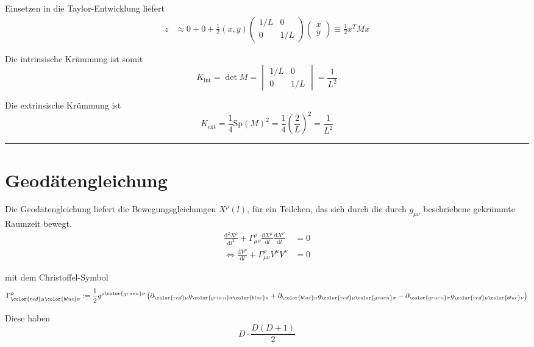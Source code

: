 \documentclass{article}
\newcommand{\diff}{\mathrm{d}}
\newcommand{\lr}[1]{\left(#1\right)}
\begin{document}
{	Einsetzen in die Taylor-Entwicklung liefert
		\begin{align*}
			z &\approx 0 + 0 + \frac{1}{2} (x,y)
			\begin{pmatrix}
				1/L & 0\\
				0 & 1/L
			\end{pmatrix}
			\begin{pmatrix}
				x\\y
			\end{pmatrix}
			\equiv \frac{1}{2} x^T M x
		\end{align*}

	Die intrinsische Krümmung ist somit
		$$K_{\text{int}} = \det M =
		\begin{vmatrix}
			1/L & 0\\
			0 & 1/L
		\end{vmatrix} = \frac{1}{L^2}$$
	
	Die extrinsische Krümmung ist
		$$K_{\text{ext}} = \frac{1}{4}\text{Sp} (M)^2 = \frac{1}{4} \lr{\frac{2}{L}}^2 = \frac{1}{L^2 }$$


\hrule
}


\newpage


\section{Geodätengleichung}
Die Geodätengleichung liefert die Bewegungsgleichungen $X^\rho(l)$, für ein Teilchen, das sich durch die durch $g_{\mu\nu}$ beschriebene gekrümmte Raumzeit bewegt.
	\begin{align}
		\frac{\diff^2X^\rho}{\diff l^2} + \Gamma^\rho_{\mu\nu} \frac{\diff X^\mu}{\diff l}\frac{\diff X^\nu}{\diff l} &= 0 \\
		\Leftrightarrow \frac{\diff V^\rho}{\diff l} + \Gamma^\rho_{\mu\nu} V^\mu V^\nu &= 0
	\end{align}

mit dem Christoffel-Symbol
	\begin{equation}
		\Gamma^\rho_{{\color{red}\mu}{\color{blue}\nu}} := \frac{1}{2}g^{\rho{\color{gruen}\sigma}} \lr{ \partial_{\color{red}\mu} g_{{\color{gruen}\sigma}{\color{blue}\nu}} + \partial_{\color{blue}\nu} g_{{\color{red}\mu}{\color{gruen}\sigma}} - \partial_{\color{gruen}\sigma} g_{{\color{red}\mu}{\color{blue}\nu}} }
	\end{equation}

Diese haben
	\begin{equation}
		D\cdot \frac{D(D+1)}{2}
	\end{equation}
\end{document}
